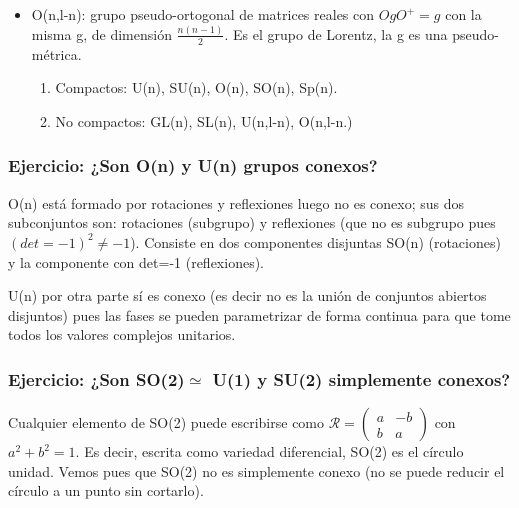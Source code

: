\documentclass{article}
\begin{document}
\begin{itemize}
        \item O(n,l-n): grupo pseudo-ortogonal de matrices reales con $OgO^+=g$ con la misma g, de dimensión $\frac{n(n-1)}{2}        $. Es el grupo de Lorentz, la g es una pseudo-métrica.
        
        \begin{enumerate}
            \item Compactos: U(n), SU(n), O(n), SO(n), Sp(n).
            
            \item No compactos: GL(n), SL(n), U(n,l-n), O(n,l-n.)
        \end{enumerate}
     \end{itemize}
     
     \subsubsection{Ejercicio: ¿Son O(n) y U(n) grupos conexos?}
     
     O(n) está formado por rotaciones y reflexiones luego no es conexo; sus dos subconjuntos son: rotaciones (subgrupo) y reflexiones (que no es subgrupo pues $(det=-1)^2 \neq -1$). Consiste en dos componentes disjuntas SO(n) (rotaciones) y la componente con det=-1 (reflexiones).
     
     \smallskip
     U(n) por otra parte sí es conexo (es decir no es la unión de conjuntos abiertos disjuntos) pues las fases se pueden parametrizar de forma continua para que tome todos los valores complejos unitarios.
     
     \subsubsection{Ejercicio: ¿Son SO(2)$\simeq $
     U(1) y SU(2) simplemente conexos?}
     
     Cualquier elemento de SO(2) puede escribirse como $\mathcal{R}= \left ( \begin{array}{cc}
         a &  -b\\
         b & a 
     \end{array}\right)$ con $a^2+b^2=1$. Es decir, escrita como variedad diferencial, SO(2) es el círculo unidad. Vemos pues que SO(2) no es simplemente conexo (no se puede reducir el círculo a un punto sin cortarlo).
     
\end{document}
